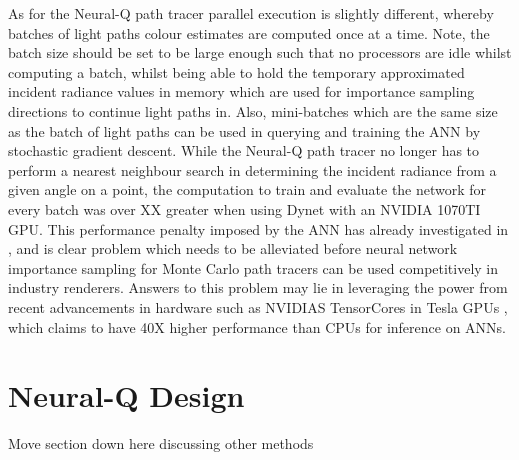\documentclass[../dissertation.tex]{subfiles}
\begin{document}
As for the Neural-Q path tracer parallel execution is slightly different, whereby batches of light paths colour estimates are computed once at a time. Note, the batch size should be set to be large enough such that no processors are idle whilst computing a batch, whilst being able to hold the temporary approximated incident radiance values in memory which are used for importance sampling directions to continue light paths in. Also, mini-batches which are the same size as the batch of light paths can be used in querying and training the ANN by stochastic gradient descent. While the Neural-Q path tracer no longer has to perform a nearest neighbour search in determining the incident radiance from a given angle on a point, the computation to train and evaluate the network for every batch was over XX greater when using Dynet with an NVIDIA 1070TI GPU. This performance penalty imposed by the ANN has already investigated in \cite{keller2019integral, muller2018neural}, and is clear problem which needs to be alleviated before neural network importance sampling for Monte Carlo path tracers can be used competitively in industry renderers. Answers to this problem may lie in leveraging the power from recent advancements in hardware such as NVIDIAS TensorCores in Tesla GPUs \cite{tensor_cores}, which claims to have 40X higher performance than CPUs for inference on ANNs.


\section{Neural-Q Design}
Move section down here discussing other methods
\end{document}

